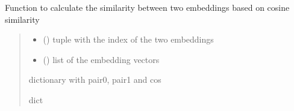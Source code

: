 \documentclass[letterpaper,10pt,english]{sphinxmanual}
\begin{document}

\begin{fulllineitems}
\label{\detokenize{auxilary_functions:auxilary_functions.cos_sim_func}}
\pysigstartsignatures
{}
\pysigstopsignatures
\sphinxAtStartPar
Function to calculate the similarity between two embeddings based on cosine similarity
\begin{quote}\begin{description}
\begin{itemize}
\item {} 
\sphinxAtStartPar
{} () \textendash{} tuple with the index of the two embeddings

\item {} 
\sphinxAtStartPar
{} () \textendash{} list of the embedding vectors

\end{itemize}

\sphinxAtStartPar
dictionary with pair0, pair1 and cos

\sphinxAtStartPar
dict

\end{description}\end{quote}

\end{fulllineitems}

\end{document}

